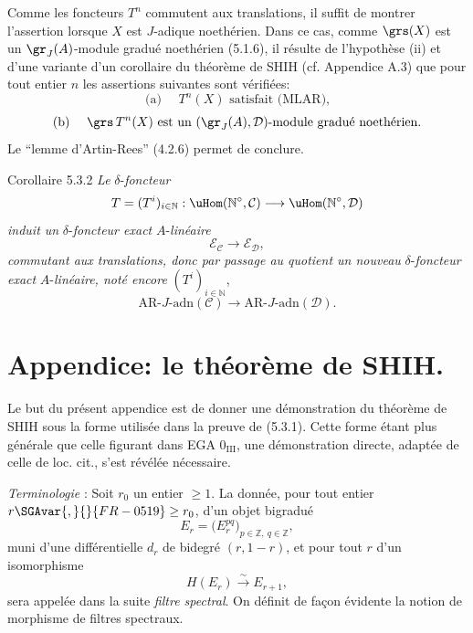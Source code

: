 \begin{prooftext}[Preuve]
Comme les foncteurs \(T^n\) commutent aux translations, il suffit de montrer l'assertion lorsque \(X\) est \(J\)-adique noethérien. Dans ce cas, comme \(\grs(X)\) est un \(\gr_J(A)\)-module gradué noethérien (5.1.6), il résulte de l'hypothèse (ii) et d'une variante d'un corollaire du théorème de SHIH (cf. Appendice A.3) que pour tout entier \(n\) les assertions suivantes sont vérifiées:
\[
\text{(a) }\quad T^n(X)\text{ satisfait (MLAR),}
\]
\[
\text{(b) }\quad \grs\,T^n(X)\text{ est un }(\gr_J(A),\mathcal{D})\text{-module gradué noethérien.}
\]
Le ``lemme d'Artin-Rees'' (4.2.6) permet de conclure.
\end{prooftext}

\begin{statement}{Corollaire 5.3.2}
\emph{Le} \(\delta\)-\emph{foncteur}
\[
T=(T^i)_{i\in\mathbb{N}}:\uHom(\mathbb{N}^\circ,\mathcal{C})\longrightarrow\uHom(\mathbb{N}^\circ,\mathcal{D})
\]
\emph{induit un} \(\delta\)-\emph{foncteur exact} \(A\)-\emph{linéaire}
\[
\mathcal{E}_{\mathcal{C}}\longrightarrow\mathcal{E}_{\mathcal{D}},
\]
\emph{commutant aux translations, donc par passage au quotient un nouveau} \(\delta\)-\emph{foncteur exact} \(A\)-\emph{linéaire, noté encore} \((T^i)_{i\in\mathbb{N}}\),
\[
\mathrm{AR}\text{-}J\text{-adn}(\mathcal{C})\longrightarrow
\mathrm{AR}\text{-}J\text{-adn}(\mathcal{D}).
\]
\end{statement}

\section*{Appendice: le théorème de SHIH.}

Le but du présent appendice est de donner une démonstration du théorème de SHIH sous la forme utilisée dans la preuve de (5.3.1). Cette forme étant plus générale que celle figurant dans EGA \(0_{\mathrm{III}}\), une démonstration directe, adaptée de celle de loc. cit., s'est révélée nécessaire.

\emph{Terminologie} : Soit \(r_0\) un entier \(\ge1\). La donnée, pour tout entier \(r\SGAvar{,}{}{FR-0519}\ge r_0\), d'un objet bigradué
\[
E_r=\bigl(E_r^{pq}\bigr)_{p\in\mathbb{Z},\ q\in\mathbb{Z}},
\]
muni d'une différentielle \(d_r\) de bidegré \((r,1-r)\), et pour tout \(r\) d'un isomorphisme
\[
H(E_r)\xrightarrow{\sim}E_{r+1},
\]
sera appelée dans la suite \emph{filtre spectral}. On définit de façon évidente la notion de morphisme de filtres spectraux.

